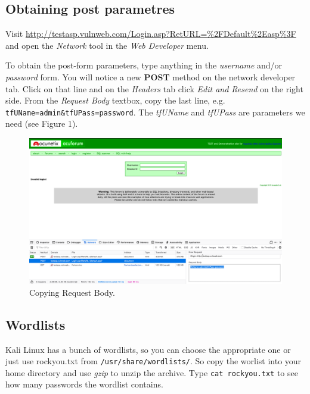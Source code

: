 \documentclass{article}
\begin{document}
\subsection{Obtaining post parametres}
Visit \href{http://testasp.vulnweb.com/Login.asp?RetURL=\%2FDefault\%2Easp\%3F}{http://testasp.vulnweb.com/Login.asp?RetURL=\%2FDefault\%2Easp\%3F} and open the \textit{Network} tool in the \textit{Web Developer} menu.

To obtain the post-form parameters, type anything in the \textit{username} and/or \textit{password} form. You will notice a new \textbf{POST} method on the network developer tab. Click on that line and on the \textit{Headers} tab click \textit{Edit and Resend} on the right side. From the \textit{Request Body} textbox, copy the last line, e.g. \texttt{tfUName=admin\&tfUPass=password}. The \textit{tfUName} and \textit{tfUPass} are parameters we need (see Figure 1).

\begin{figure}[h]
  \centering
  \includegraphics[width=12cm]{request-body}
  \caption{Copying Request Body.}
\end{figure}

\subsection{Wordlists}
Kali Linux has a bunch of wordlists, so you can choose the appropriate one or just use rockyou.txt from \texttt{/usr/share/wordlists/}. So copy the worlist into your home directory and use \textit{gzip} to unzip the archive. Type \texttt{cat rockyou.txt} to see how many passwords the wordlist contains.
\end{document}
